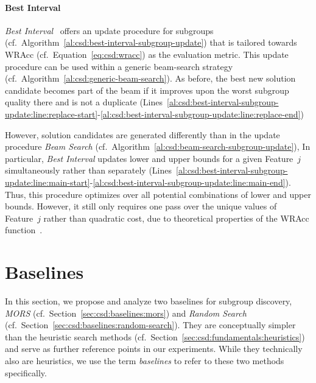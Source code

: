 \documentclass{article}
\theoremstyle{definition}
\begin{document}
\paragraph{Best Interval}

\emph{Best Interval}~\cite{mampaey2012efficient} offers an update procedure for subgroups (cf.~Algorithm~\ref{al:csd:best-interval-subgroup-update}) that is tailored towards WRAcc (cf.~Equation~\ref{eq:csd:wracc}) as the evaluation metric.
This update procedure can be used within a generic beam-search strategy (cf.~Algorithm~\ref{al:csd:generic-beam-search}).
As before, the best new solution candidate becomes part of the beam if it improves upon the worst subgroup quality there and is not a duplicate (Lines~\ref{al:csd:best-interval-subgroup-update:line:replace-start}-\ref{al:csd:best-interval-subgroup-update:line:replace-end})

However, solution candidates are generated differently than in the update procedure \emph{Beam Search} (cf.~Algorithm~\ref{al:csd:beam-search-subgroup-update}),
In particular, \emph{Best Interval} updates lower and upper bounds for a given Feature~$j$ simultaneously rather than separately (Lines~\ref{al:csd:best-interval-subgroup-update:line:main-start}-\ref{al:csd:best-interval-subgroup-update:line:main-end}).
Thus, this procedure optimizes over all potential combinations of lower and upper bounds.
However, it still only requires one pass over the unique values of Feature~$j$ rather than quadratic cost, due to theoretical properties of the WRAcc function~\cite{mampaey2012efficient}.

\section{Baselines}
\label{sec:csd:baselines}

In this section, we propose and analyze two baselines for subgroup discovery, \emph{MORS} (cf.~Section~\ref{sec:csd:baselines:mors}) and \emph{Random Search} (cf.~Section~\ref{sec:csd:baselines:random-search}).
They are conceptually simpler than the heuristic search methods (cf.~Section~\ref{sec:csd:fundamentals:heuristics}) and serve as further reference points in our experiments.
While they technically also are heuristics, we use the term \emph{baselines} to refer to these two methods specifically.
\end{document}
